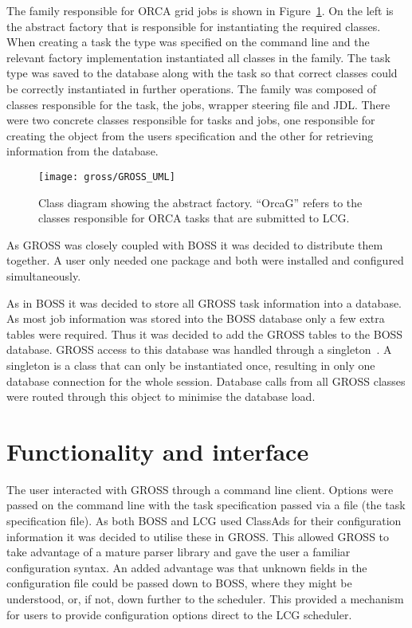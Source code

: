 The family responsible for ORCA grid jobs is shown in Figure~\ref{fig:OrcaG_Factory}. On the left is the abstract factory that is responsible for instantiating the required classes. When creating a task the type was specified on the command line and the relevant factory implementation instantiated all classes in the family. The task type was saved to the database along with the task so that correct classes could be correctly instantiated in further operations. The family was composed of classes responsible for the task, the jobs, wrapper steering file and JDL. There were two concrete classes responsible for tasks and jobs, one responsible for creating the object from the users specification and the other for retrieving information from the database.

\begin{figure}[!tbp]
  \centering
  \texttt{[image: gross/GROSS\_UML]}\\[1mm]
  \caption{Class diagram showing the abstract factory. ``OrcaG'' refers to the classes responsible for ORCA tasks that are submitted to LCG.~\cite{citeulike:878837}
  \label{fig:OrcaG_Factory}}
\end{figure}


As GROSS was closely coupled with BOSS it was decided to distribute them together. A user only needed one package and both were installed and configured simultaneously.

As in BOSS it was decided to store all GROSS task information into a database. As most job information was stored into the BOSS database only a few extra tables were required. Thus it was decided to add the GROSS tables to the BOSS database. GROSS access to this database was handled through a singleton~\cite{citeulike:115158}. A singleton is a class that can only be instantiated once, resulting in only one database connection for the whole session. Database calls from all GROSS classes were routed through this object to minimise the database load.

\section{Functionality and interface}
The user interacted with GROSS through a command line client. Options were passed on the command line with the task specification passed via a file (the task specification file). As both BOSS and LCG used ClassAds for their configuration information it was decided to utilise these in GROSS. This allowed GROSS to take advantage of a mature parser library and gave the user a familiar configuration syntax. An added advantage was that unknown fields in the configuration file could be passed down to BOSS, where they might be understood, or, if not, down further to the scheduler. This provided a mechanism for users to provide configuration options direct to the LCG scheduler.

